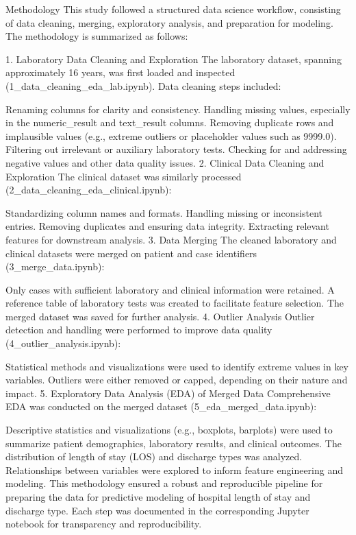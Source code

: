 \documentclass{article}
\begin{document}
    Methodology
    This study followed a structured data science workflow, consisting of data cleaning, merging, exploratory analysis, and preparation for modeling. The methodology is summarized as follows:

    1. Laboratory Data Cleaning and Exploration
    The laboratory dataset, spanning approximately 16 years, was first loaded and inspected (1_data_cleaning_eda_lab.ipynb). Data cleaning steps included:

    Renaming columns for clarity and consistency.
    Handling missing values, especially in the numeric_result and text_result columns.
    Removing duplicate rows and implausible values (e.g., extreme outliers or placeholder values such as 9999.0).
    Filtering out irrelevant or auxiliary laboratory tests.
    Checking for and addressing negative values and other data quality issues.
    2. Clinical Data Cleaning and Exploration
    The clinical dataset was similarly processed (2_data_cleaning_eda_clinical.ipynb):

    Standardizing column names and formats.
    Handling missing or inconsistent entries.
    Removing duplicates and ensuring data integrity.
    Extracting relevant features for downstream analysis.
    3. Data Merging
    The cleaned laboratory and clinical datasets were merged on patient and case identifiers (3_merge_data.ipynb):

    Only cases with sufficient laboratory and clinical information were retained.
    A reference table of laboratory tests was created to facilitate feature selection.
    The merged dataset was saved for further analysis.
    4. Outlier Analysis
    Outlier detection and handling were performed to improve data quality (4_outlier_analysis.ipynb):

    Statistical methods and visualizations were used to identify extreme values in key variables.
    Outliers were either removed or capped, depending on their nature and impact.
    5. Exploratory Data Analysis (EDA) of Merged Data
    Comprehensive EDA was conducted on the merged dataset (5_eda_merged_data.ipynb):

    Descriptive statistics and visualizations (e.g., boxplots, barplots) were used to summarize patient demographics, laboratory results, and clinical outcomes.
    The distribution of length of stay (LOS) and discharge types was analyzed.
    Relationships between variables were explored to inform feature engineering and modeling.
    This methodology ensured a robust and reproducible pipeline for preparing the data for predictive modeling of hospital length of stay and discharge type. Each step was documented in the corresponding Jupyter notebook for transparency and reproducibility.
\end{document}
